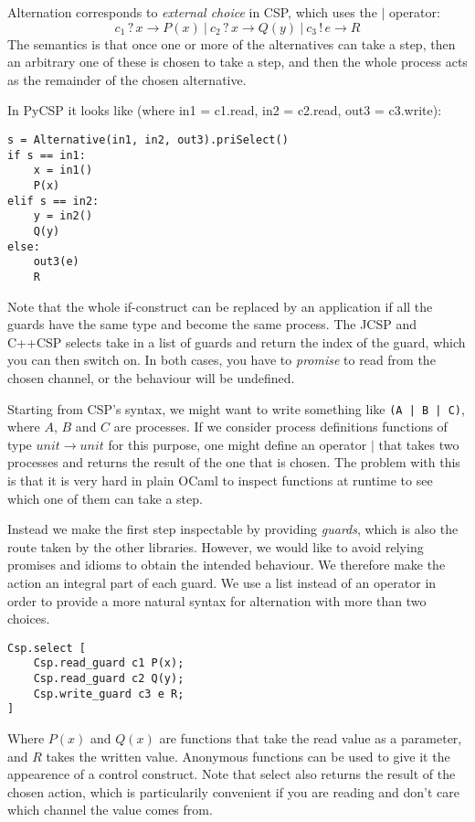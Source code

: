 \documentclass[a4paper,12pt]{article}
\begin{document}
Alternation corresponds to \emph{external choice} in CSP, which uses the $|$ operator:
\[c_1\,?\,x \to P(x)\ |\ c_2\,?\,x \to Q(y)\ |\ c_3\,!\,e \to R\]
The semantics is that once one or more of the alternatives can take a step, then
an arbitrary one of these is chosen to take a step, and then the whole process acts as 
the remainder of the chosen alternative.

In PyCSP it looks like (where in1 = c1.read, in2 = c2.read, out3 = c3.write):
\begin{verbatim}
s = Alternative(in1, in2, out3).priSelect()
if s == in1:
    x = in1()
    P(x)
elif s == in2:
    y = in2()
    Q(y)
else:
    out3(e)
    R
\end{verbatim}

Note that the whole if-construct can be replaced by an application if all the guards have the same type 
and become the same process. The JCSP and C++CSP selects take in a list of guards and return the index
of the guard, which you can then switch on. In both cases, you have to \emph{promise} to read from the
chosen channel, or the behaviour will be undefined.

Starting from CSP's syntax, we might want to write something like \texttt{(A | B | C)}, where $A$, $B$
and $C$ are processes. If we consider process definitions functions of type $unit \to unit$ for this 
purpose, one might define an operator $|$ that takes two processes and returns the result of the one that 
is chosen. The problem with this is that it is very hard in plain OCaml to inspect functions at runtime 
to see which one of them can take a step.

Instead we make the first step inspectable by providing \emph{guards}, which is also the route taken by
the other libraries. However, we would like to avoid relying promises and idioms to obtain the 
intended behaviour. We therefore make the action an integral part of each guard. We use a list instead
of an operator in order to provide a more natural syntax for alternation with more than two choices.

\begin{verbatim}
Csp.select [
    Csp.read_guard c1 P(x);
    Csp.read_guard c2 Q(y);
    Csp.write_guard c3 e R;
]
\end{verbatim}
Where $P(x)$ and $Q(x)$ are functions that take the read value as a parameter, and $R$ takes the written 
value. Anonymous functions can be used to give it the appearence of a control construct. Note that select 
also returns the result of the chosen action, which is particularily convenient if you are reading and 
don't care which channel the value comes from.
\end{document}
